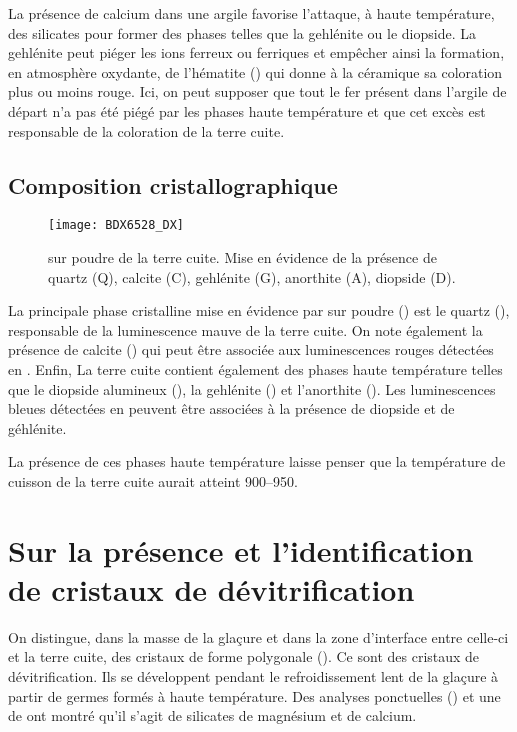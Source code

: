 La présence de calcium dans une argile favorise l'attaque, à haute 
température, des silicates pour former des phases telles que la 
gehlénite ou le diopside. La gehlénite peut piéger les ions ferreux 
ou ferriques et empêcher ainsi la formation, en atmosphère oxydante, 
de l'hématite () qui donne à la céramique sa coloration 
plus ou moins rouge. Ici, on peut supposer que tout le fer présent 
dans l'argile de départ n'a pas été piégé par les phases haute 
température et que cet excès est responsable de la coloration de 
la terre cuite.

\subsection{Composition cristallographique}
\begin{figure}[htb]
  \texttt{[image: BDX6528\_DX]}
  \caption[\ -- \DX sur poudre de la terre cuite]
          {\legendeA 
           \DX sur poudre de la terre cuite. Mise en évidence de la présence de quartz (Q), calcite (C), gehlénite (G), anorthite (A), diopside (D).}
  \label{DRX:6528}
\end{figure}

La principale phase cristalline mise en évidence par \DX sur poudre () est le quartz (), responsable de la luminescence mauve de la terre cuite. On note également la présence de calcite () qui peut être associée aux luminescences rouges détectées en \CL. Enfin, La terre cuite contient également des phases haute température telles que le diopside alumineux (), la gehlénite () et l'anorthite (). Les luminescences bleues détectées en \CL peuvent être associées à la présence de diopside et de géhlénite.

La présence de ces phases haute température laisse penser 
que la température de cuisson de la terre cuite aurait atteint 
\SIrange[range-phrase=\ à\ ]{900}{950}{\degC}.


\section{Sur la présence et l'identification de cristaux de 
         dévitrification}

On distingue, dans la masse de la glaçure et dans la zone d'interface entre celle-ci et la terre cuite, des cristaux de forme polygonale (). Ce sont des cristaux de dévitrification. Ils se développent pendant le refroidissement lent de la glaçure à partir de germes formés à haute température. Des analyses ponctuelles () et une \carto de \RX ont montré qu'il s'agit de silicates de magnésium et de calcium.

